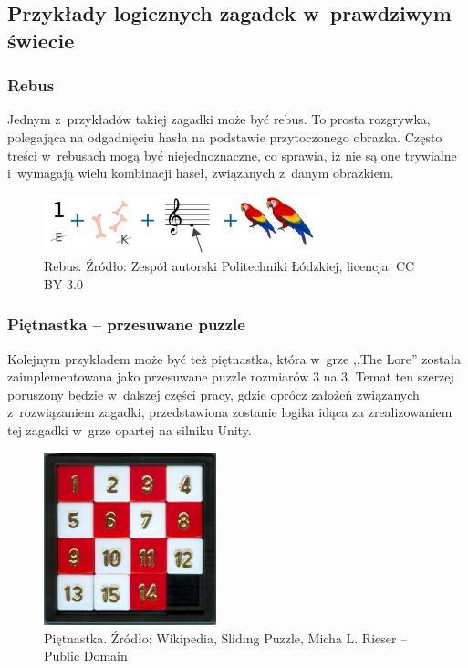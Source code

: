 \documentclass[oneside,polski,logo]{amuthesis}
\begin{document}
\subsection{Przykłady logicznych zagadek w~prawdziwym świecie}
\subsubsection{Rebus}
\par Jednym z~przykładów takiej zagadki może być rebus. To prosta rozgrywka, polegająca na odgadnięciu hasła na podstawie przytoczonego obrazka. Często treści w~rebusach mogą być niejednoznaczne, co sprawia, iż nie są one trywialne i~wymagają wielu kombinacji haseł, związanych z~danym obrazkiem. \cite{rebus}

\begin{figure}[h]
\centering
\includegraphics[width=8cm]{images/tyrek/rebus.png}
\caption{Rebus. Źródło: Zespół autorski Politechniki Łódzkiej, licencja: CC BY 3.0}
\end{figure}

\subsubsection{Piętnastka – przesuwane puzzle}
\par Kolejnym przykładem może być też piętnastka, która w~grze ,,The Lore'' została zaimplementowana jako przesuwane puzzle rozmiarów 3 na 3. Temat ten szerzej poruszony będzie w~dalszej części pracy, gdzie oprócz założeń związanych z~rozwiązaniem zagadki, przedstawiona zostanie logika idąca za zrealizowaniem tej zagadki w~grze opartej na silniku Unity. 

\begin{figure}[h]
\centering
\includegraphics[width=5cm]{images/tyrek/przesuwane-puzzle.jpg}
\caption{Piętnastka. Źródło: Wikipedia, Sliding Puzzle, Micha L. Rieser – Public Domain}
\end{figure}
\end{document}
